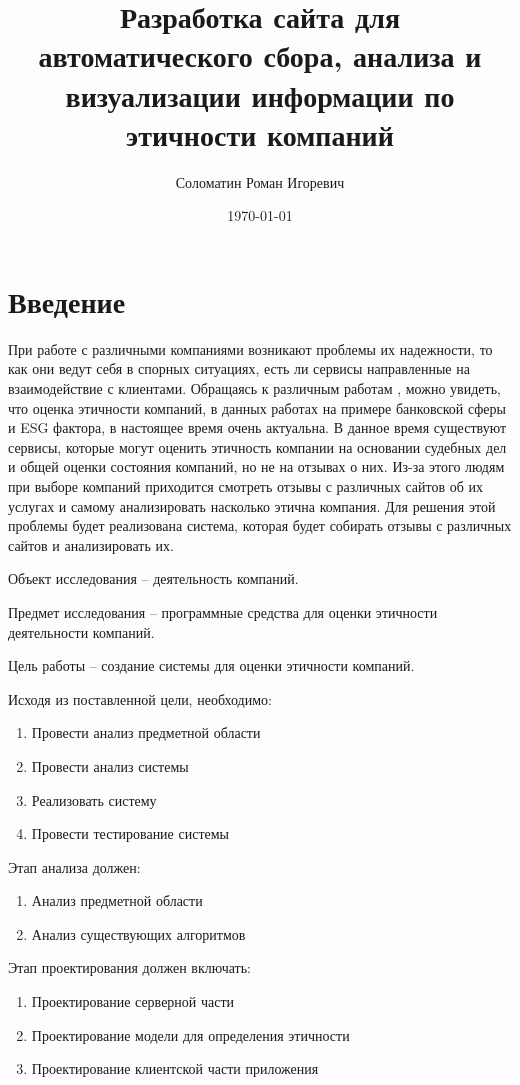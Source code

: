 \documentclass[PI, VKR]{HSEUniversity}
\author{Соломатин Роман Игоревич}
\date{\today}
\title{Разработка сайта для автоматического сбора, анализа и визуализации информации по этичности компаний}
\begin{document}
\maketitle

\chapter*{Введение}
\label{sec:org4711bab}
При работе с различными компаниями возникают проблемы их надежности, то как они ведут себя в спорных ситуациях, есть ли сервисы направленные на взаимодействие с клиентами. Обращаясь к различным работам \autocites{mure_esg_2021}[][]{miralles-quiros_esg_2019}[][]{climent_ethical_2018}, можно увидеть, что оценка этичности компаний, в данных работах на примере банковской сферы и ESG фактора, в настоящее время очень актуальна. В данное время существуют сервисы, которые могут оценить этичность компании на основании судебных дел и общей оценки состояния компаний, но не на отзывах о них. Из-за этого людям при выборе компаний приходится смотреть отзывы с различных сайтов об их услугах и самому анализировать насколько этична компания. Для решения этой проблемы будет реализована система, которая будет собирать отзывы с различных сайтов и анализировать их.

Объект исследования – деятельность компаний.

Предмет исследования – программные средства для оценки этичности деятельности компаний.

Цель работы – создание системы для оценки этичности компаний.

Исходя из поставленной цели, необходимо:

\begin{enumerate}
\item Провести анализ предметной области
\item Провести анализ системы
\item Реализовать систему
\item Провести тестирование системы
\end{enumerate}

Этап анализа должен:
\begin{enumerate}
\item Анализ предметной области
\item Анализ существующих алгоритмов
\end{enumerate}

Этап проектирования должен включать:
\begin{enumerate}
\item Проектирование серверной части
\item Проектирование модели для определения этичности
\item Проектирование клиентской части приложения
\end{enumerate}
\end{document}
